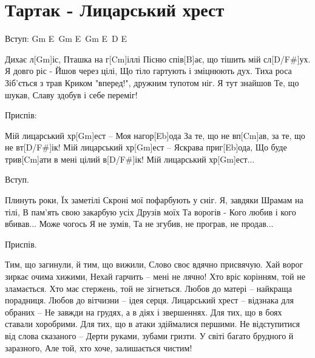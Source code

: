 \section{Тартак - Лицарський хрест}
\begin{guitar}
Вступ: Gm E\guitarFlat\ Gm E\guitarFlat\ Gm E\guitarFlat\ D E\guitarFlat

Дихає л[Gm]іс,
Пташка на г[Cm]іллі
Пісню спів[B]ає, що тішить мій сл[D/F#]ух.
Я довго ріс -
Йшов через цілі,
Що тіло гартують і зміцнюють дух.
Тиха роса
Зіб'ється з трав
Криком "вперед!", дружним тупотом ніг.
Я тут знайшов
Те, що шукав,
Славу здобув і себе переміг!

Приспів:

Мій лицарський хр[Gm]ест –
Моя нагор[Eb]ода
За те, що не вп[Cm]ав, за те, що не вт[D/F#]ік!
Мій лицарський хр[Gm]ест –
Яскрава приг[Eb]ода,
Що буде трив[Cm]ати в мені цілий в[D/F#]ік!
Мій лицарський хр[Gm]ест...

Вступ.

Плинуть роки,
Їх заметілі
Скроні мої пофарбують у сніг.
Я, завдяки
Шрамам на тілі,
В пам'ять свою закарбую усіх
Друзів моїх
Та ворогів -
Кого любив і кого вбивав...
Може чогось
Я не зумів,
Та не згубив, не програв, не продав...

Приспів.

Тим, що загинули, й тим, що вижили,
Слово своє вдячно присвячую.
Хай ворог зиркає очима хижими,
Нехай гарчить – мені не лячно!
Хто вріс корінням, той не зламається.
Хто має стержень, той не зігнеться.
Любов до матері – найкраща порадниця.
Любов до вітчизни – ідея серця.
Лицарський хрест – відзнака для обраних –
Не завжди на грудях, а в діях і звершеннях.
Для тих, що в боях ставали хоробрими.
Для тих, що в атаки здіймалися першими.
Не відступитися від слова сказаного –
Дерти руками, зубами гризти.
У світі багато брудного й заразного,
Але той, хто хоче, залишається чистим!
\end{guitar}
